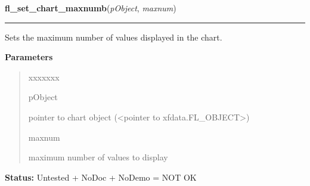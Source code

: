 \hspace{.8\funcindent}\begin{boxedminipage}{\funcwidth}

    \raggedright \textbf{fl\_set\_chart\_maxnumb}(\textit{pObject}, \textit{maxnum})

    \vspace{-1.5ex}

    \rule{\textwidth}{0.5\fboxrule}
\setlength{\parskip}{2ex}
    Sets the maximum number of values displayed in the chart.

\setlength{\parskip}{1ex}
      \textbf{Parameters}
      \vspace{-1ex}

      \begin{quote}
        \begin{Ventry}{xxxxxxx}

          \item[pObject]

          pointer to chart object ({\textless}pointer to 
          xfdata.FL\_OBJECT{\textgreater})

          \item[maxnum]

          maximum number of values to display

        \end{Ventry}

      \end{quote}

\textbf{Status:} Untested + NoDoc + NoDemo = NOT OK



    \end{boxedminipage}

    \label{xformslib:library:fl_set_chart_autosize}

    \vspace{0.5ex}

